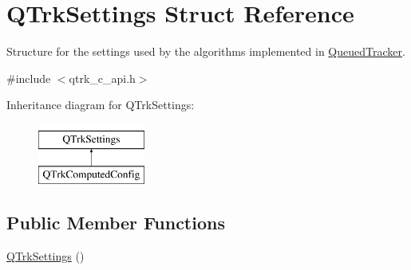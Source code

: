 \hypertarget{struct_q_trk_settings}{}\section{Q\+Trk\+Settings Struct Reference}
\label{struct_q_trk_settings}


Structure for the settings used by the algorithms implemented in \hyperlink{class_queued_tracker}{Queued\+Tracker}.  




{\ttfamily \#include $<$qtrk\+\_\+c\+\_\+api.\+h$>$}

Inheritance diagram for Q\+Trk\+Settings\+:\begin{figure}[H]
\begin{center}
\leavevmode
\includegraphics[height=2.000000cm]{struct_q_trk_settings}
\end{center}
\end{figure}
\subsection*{Public Member Functions}
\begin{DoxyCompactItemize}
\item 
\hyperlink{struct_q_trk_settings_a5d3675dfece085b68b5c508697989b87}{Q\+Trk\+Settings} ()
\end{DoxyCompactItemize}
